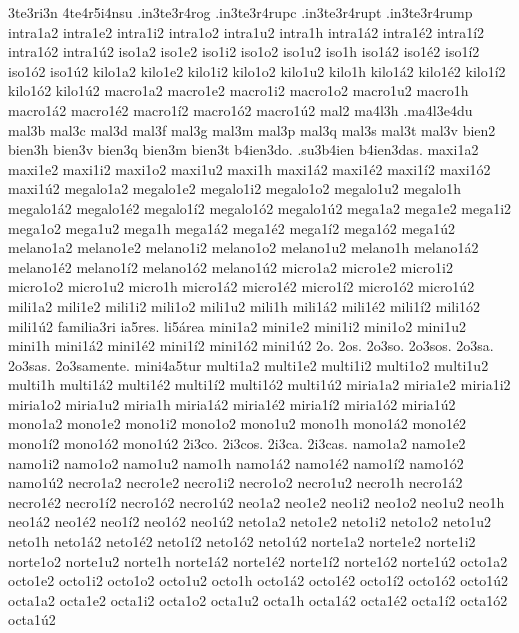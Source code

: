 {3te3ri3n 4te4r5i4nsu
.in3te3r4rog
.in3te3r4rupc .in3te3r4rupt .in3te3r4rump
intra1a2 intra1e2 intra1i2 intra1o2 intra1u2 intra1h
intra1^^e12 intra1^^e92 intra1^^ed2 intra1^^f32 intra1^^fa2
iso1a2 iso1e2 iso1i2 iso1o2 iso1u2 iso1h
iso1^^e12 iso1^^e92 iso1^^ed2 iso1^^f32 iso1^^fa2
kilo1a2 kilo1e2 kilo1i2 kilo1o2 kilo1u2 kilo1h
kilo1^^e12 kilo1^^e92 kilo1^^ed2 kilo1^^f32 kilo1^^fa2
macro1a2 macro1e2 macro1i2 macro1o2 macro1u2 macro1h
macro1^^e12 macro1^^e92 macro1^^ed2 macro1^^f32 macro1^^fa2
mal2 ma4l3h .ma4l3e4du mal3b mal3c mal3d mal3f mal3g
mal3m mal3p mal3q mal3s mal3t mal3v
bien2 bien3h bien3v bien3q bien3m bien3t
b4ien3do. .su3b4ien b4ien3das.
maxi1a2 maxi1e2 maxi1i2 maxi1o2 maxi1u2 maxi1h
maxi1^^e12 maxi1^^e92 maxi1^^ed2 maxi1^^f32 maxi1^^fa2
megalo1a2 megalo1e2 megalo1i2 megalo1o2 megalo1u2 megalo1h
megalo1^^e12 megalo1^^e92 megalo1^^ed2 megalo1^^f32 megalo1^^fa2
mega1a2 mega1e2 mega1i2 mega1o2 mega1u2 mega1h
mega1^^e12 mega1^^e92 mega1^^ed2 mega1^^f32 mega1^^fa2
melano1a2 melano1e2 melano1i2 melano1o2 melano1u2 melano1h
melano1^^e12 melano1^^e92 melano1^^ed2 melano1^^f32 melano1^^fa2
micro1a2 micro1e2 micro1i2 micro1o2 micro1u2 micro1h
micro1^^e12 micro1^^e92 micro1^^ed2 micro1^^f32 micro1^^fa2
mili1a2 mili1e2 mili1i2 mili1o2 mili1u2 mili1h
mili1^^e12 mili1^^e92 mili1^^ed2 mili1^^f32 mili1^^fa2
familia3ri ia5res.
li5^^e1rea
mini1a2 mini1e2 mini1i2 mini1o2 mini1u2 mini1h
mini1^^e12 mini1^^e92 mini1^^ed2 mini1^^f32 mini1^^fa2
2o. 2os. 2o3so. 2o3sos. 2o3sa. 2o3sas. 2o3samente.
mini4a5tur
multi1a2 multi1e2 multi1i2 multi1o2 multi1u2 multi1h
multi1^^e12 multi1^^e92 multi1^^ed2 multi1^^f32 multi1^^fa2
miria1a2 miria1e2 miria1i2 miria1o2 miria1u2 miria1h
miria1^^e12 miria1^^e92 miria1^^ed2 miria1^^f32 miria1^^fa2
mono1a2 mono1e2 mono1i2 mono1o2 mono1u2 mono1h
mono1^^e12 mono1^^e92 mono1^^ed2 mono1^^f32 mono1^^fa2
2i3co. 2i3cos. 2i3ca. 2i3cas.
namo1a2 namo1e2 namo1i2 namo1o2 namo1u2 namo1h
namo1^^e12 namo1^^e92 namo1^^ed2 namo1^^f32 namo1^^fa2
necro1a2 necro1e2 necro1i2 necro1o2 necro1u2 necro1h
necro1^^e12 necro1^^e92 necro1^^ed2 necro1^^f32 necro1^^fa2
neo1a2 neo1e2 neo1i2 neo1o2 neo1u2 neo1h
neo1^^e12 neo1^^e92 neo1^^ed2 neo1^^f32 neo1^^fa2
neto1a2 neto1e2 neto1i2 neto1o2 neto1u2 neto1h
neto1^^e12 neto1^^e92 neto1^^ed2 neto1^^f32 neto1^^fa2
norte1a2 norte1e2 norte1i2 norte1o2 norte1u2 norte1h
norte1^^e12 norte1^^e92 norte1^^ed2 norte1^^f32 norte1^^fa2
octo1a2 octo1e2 octo1i2 octo1o2 octo1u2 octo1h
octo1^^e12 octo1^^e92 octo1^^ed2 octo1^^f32 octo1^^fa2
octa1a2 octa1e2 octa1i2 octa1o2 octa1u2 octa1h
octa1^^e12 octa1^^e92 octa1^^ed2 octa1^^f32 octa1^^fa2
}
